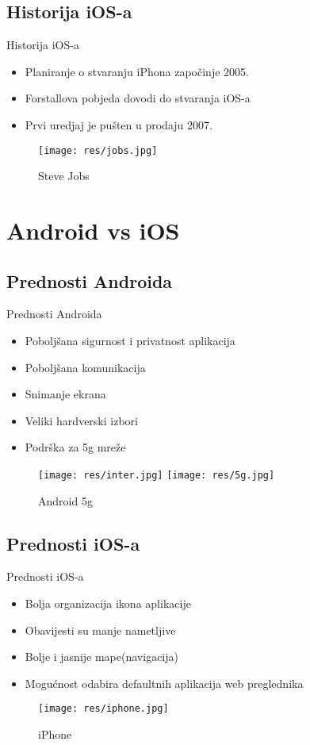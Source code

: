 \documentclass{beamer}
\begin{document}
\subsection{Historija iOS-a}
\begin{frame}{Historija iOS-a}
\begin{itemize}
\item Planiranje o stvaranju iPhona započinje 2005.
\item Forstallova pobjeda dovodi do stvaranja iOS-a
\item Prvi uredjaj je pušten u prodaju 2007.
\end{itemize}
\begin{figure}
\centering
\captionsetup{}
\texttt{[image: res/jobs.jpg]}
\caption{Steve Jobs}
\end{figure}
\end{frame}
\section{Android vs iOS}
\subsection{Prednosti Androida}
\begin{frame}{Prednosti Androida}
\begin{itemize}
\item Poboljšana sigurnost i privatnost aplikacija
\item Poboljšana komunikacija
\item Snimanje ekrana
\item Veliki hardverski izbori
\item Podrška za 5g mreže
\end{itemize}
\begin{figure}
\centering
\captionsetup{}
\texttt{[image: res/inter.jpg]}
\texttt{[image: res/5g.jpg]}
\caption{Android 5g}
\end{figure}
\end{frame}
\subsection{Prednosti iOS-a}
\begin{frame}{Prednosti iOS-a}
\begin{itemize}
\item Bolja organizacija ikona aplikacije 
\item Obavijesti su manje nametljive
\item Bolje i jasnije mape(navigacija)
\item Mogućnost odabira defaultnih aplikacija web preglednika
\end{itemize}
\begin{figure}[h]
\centering
\captionsetup{}
\texttt{[image: res/iphone.jpg]}
\caption{iPhone}
\end{figure}
\end{frame}
\end{document}
